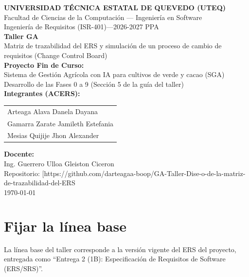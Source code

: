 \documentclass[12pt,a4paper]{article}
\begin{document}
\begin{titlepage}
\centering
\vspace*{1cm}
{\Large\bfseries UNIVERSIDAD TÉCNICA ESTATAL DE QUEVEDO (UTEQ)}\\[0.3cm]
{\large Facultad de Ciencias de la Computación --- Ingeniería en Software}\\[0.2cm]
{\large Ingeniería de Requisitos (ISR-401)---2026-2027 PPA}\\[2cm]

{\Huge\bfseries Taller GA}\\[0.5cm]
{\LARGE Matriz de trazabilidad del ERS y simulación de un proceso de cambio de requisitos (Change Control Board)}\\[1cm]

{\large\bfseries Proyecto Fin de Curso:}\\
{\large Sistema de Gestión Agrícola con IA para cultivos de verde y cacao (SGA)}\\[0.3cm]
{\large Desarrollo de las Fases 0 a 9 (Sección 5 de la guía del taller)}\\[2cm]

{\large\bfseries Integrantes (ACERS):}\\[0.3cm]
\begin{tabular}{l}
Arteaga Alava Danela Dayana \\
Gamarra Zarate Jamileth Estefania \\
Mesias Quijije Jhon Alexander \\
\end{tabular}
\vspace{1cm}

{\large\bfseries Docente:}\\
Ing. Guerrero Ulloa Gleiston Ciceron\\[2cm]

{\large Repositorio: [https://github.com/darteagaa-boop/GA-Taller-Dise-o-de-la-matriz-de-trazabilidad-del-ERS}\\[1cm]
\vfill
{\large \today}
\end{titlepage}

\section{Fijar la línea base }

La línea base del taller corresponde a la versión vigente del ERS del proyecto, entregada como ``Entrega 2 (1B): Especificación de Requisitos de Software (ERS/SRS)''.
\end{document}
